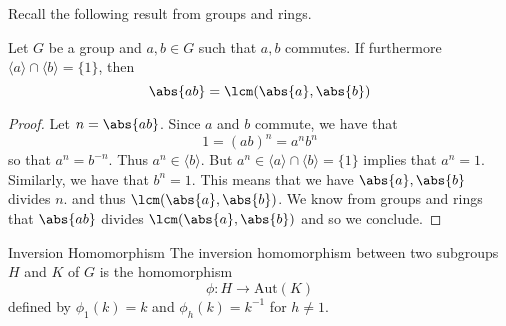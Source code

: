 \documentclass[a4paper]{article}
\begin{document}
Recall the following result from groups and rings. 

\begin{prp}{}{} Let $G$ be a group and $a,b\in G$ such that $a,b$ commutes. If furthermore $\langle a\rangle\cap\langle b\rangle=\{1\}$, then $$\abs{ab}=\lcm(\abs{a},\abs{b})$$ \tcbline
\begin{proof}
Let $n=\abs{ab}$. Since $a$ and $b$ commute, we have that $$1=(ab)^n=a^nb^n$$ so that $a^n=b^{-n}$. Thus $a^n\in\langle b\rangle$. But $a^n\in\langle a\rangle\cap\langle b\rangle=\{1\}$ implies that $a^n=1$. Similarly, we have that $b^n=1$. This means that we have $\abs{a},\abs{b}$ divides $n$. and thus $\lcm(\abs{a},\abs{b})$. We know from groups and rings that $\abs{ab}$ divides $\lcm(\abs{a},\abs{b})$ and so we conclude. 
\end{proof}
\end{prp}

\begin{defn}{Inversion Homomorphism}{} The inversion homomorphism between two subgroups $H$ and $K$ of $G$ is the homomorphism $$\phi:H\to\text{Aut}(K)$$ defined by $\phi_1(k)=k$ and $\phi_h(k)=k^{-1}$ for $h\neq 1$. 
\end{defn}
\end{document}
